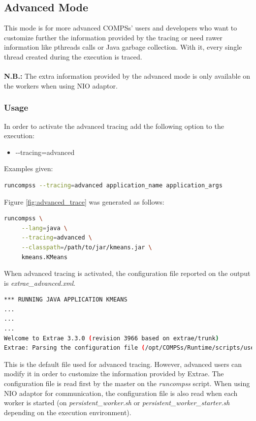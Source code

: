 \subsection{Advanced Mode}
This mode is for more advanced COMPSs' users and developers who want to customize further the information provided by the tracing or need rawer information like pthreads calls or Java garbage collection. With it, every single thread created during the execution is traced.
\\
\\
\textbf{N.B.:} The extra information provided by the advanced mode is only available on the workers when using NIO adaptor.


\subsubsection{Usage}

In order to activate the advanced tracing add the following option to the execution:

\begin{itemize}
 \item -{}-tracing=advanced
\end{itemize}

\noindent Examples given:

\begin{lstlisting}[language=bash]
runcompss --tracing=advanced application_name application_args
\end{lstlisting}

\noindent Figure \ref{fig:advanced_trace} was generated as follows:


\begin{lstlisting}[language=bash]
runcompss \
     --lang=java \
     --tracing=advanced \
     --classpath=/path/to/jar/kmeans.jar \
     kmeans.KMeans
\end{lstlisting}


When advanced tracing is activated, the configuration file reported on the output is \textit{extrae\_advanced.xml}. 

\begin{lstlisting}[language=bash]
*** RUNNING JAVA APPLICATION KMEANS
...
...
...
Welcome to Extrae 3.3.0 (revision 3966 based on extrae/trunk)
Extrae: Parsing the configuration file (/opt/COMPSs/Runtime/scripts/user/../../configuration/xml/tracing/extrae_advanced.xml) begins
\end{lstlisting}

This is the default file used for advanced tracing. However, advanced users can modify it in order to customize the information provided by Extrae. The configuration file is read first by the master on the \textit{runcompss} script. When using NIO adaptor for communication, the configuration file is also read when each worker is started (on \textit{persistent\_worker.sh} or \textit{persistent\_worker\_starter.sh} depending on the execution environment).

